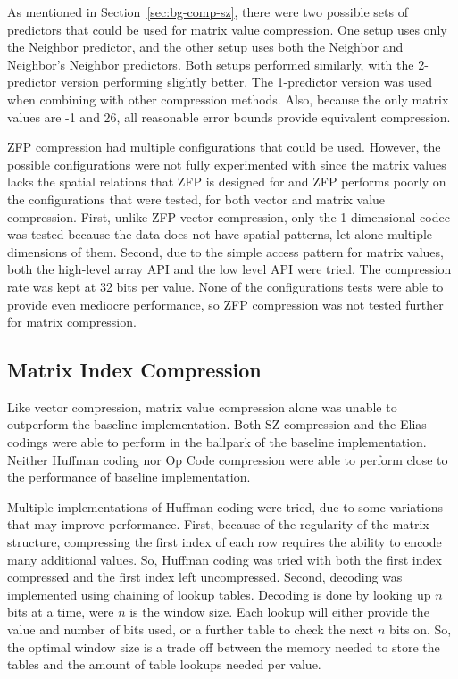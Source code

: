 As mentioned in Section~\ref{sec:bg-comp-sz}, there were two possible sets of predictors that could be used for matrix value compression.
One setup uses only the Neighbor predictor, and the other setup uses both the Neighbor and Neighbor's Neighbor predictors.
Both setups performed similarly, with the 2-predictor version performing slightly better.
The 1-predictor version was used when combining with other compression methods.
Also, because the only matrix values are -1 and 26, all reasonable error bounds provide equivalent compression.

ZFP compression had multiple configurations that could be used.
However, the possible configurations were not fully experimented with since the matrix values lacks the spatial relations that ZFP is designed for and ZFP performs poorly on the configurations that were tested, for both vector and matrix value compression.
First, unlike ZFP vector compression, only the 1-dimensional codec was tested because the data does not have spatial patterns, let alone multiple dimensions of them.
Second, due to the simple access pattern for matrix values, both the high-level array API and the low level API were tried.
The compression rate was kept at 32 bits per value.
None of the configurations tests were able to provide even mediocre performance, so ZFP compression was not tested further for matrix compression.

\subsection{Matrix Index Compression}
Like vector compression, matrix value compression alone was unable to outperform the baseline implementation.
Both SZ compression and the Elias codings were able to perform in the ballpark of the baseline implementation.
Neither Huffman coding nor Op Code compression were able to perform close to the performance of baseline implementation.


Multiple implementations of Huffman coding were tried, due to some variations that may improve performance.
First, because of the regularity of the matrix structure, compressing the first index of each row requires the ability to encode many additional values.
So, Huffman coding was tried with both the first index compressed and the first index left uncompressed.
Second, decoding was implemented using chaining of lookup tables.
Decoding is done by looking up \(n\) bits at a time, were \(n\) is the window size.
Each lookup will either provide the value and number of bits used, or a further table to check the next \(n\) bits on.
So, the optimal window size is a trade off between the memory needed to store the tables and the amount of table lookups needed per value.


